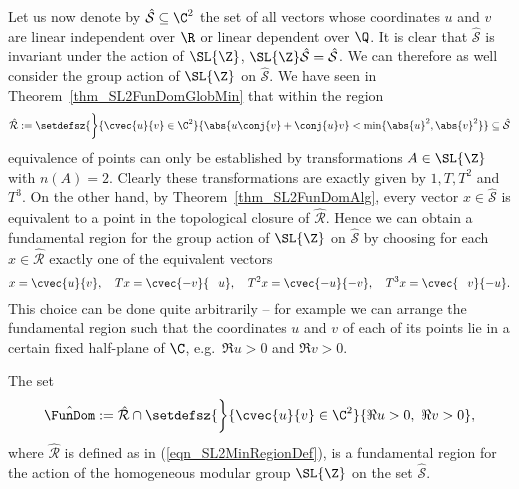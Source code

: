 Let us now denote by $\hat{\mathcal{S}} \subseteq \C^2$ the set of all vectors whose coordinates $u$ and $v$ are linear independent over $\R$ or linear dependent over $\Q$. It is clear that $\hat{\mathcal{S}}$ is invariant under the action of $\SL{\Z}$, \ie $\SL{\Z}\hat{\mathcal{S}} = \hat{\mathcal{S}}$. We can therefore as well consider the group action of $\SL{\Z}$ on $\hat{\mathcal{S}}$. We have seen in Theorem~\ref{thm_SL2FunDomGlobMin} that within the region
\begin{equation}
\label{eqn_SL2MinRegionDef}
\hat{\mathcal{R}} := \setdefsz{\bigg}{\cvec{u}{v} \in \C^2}{\abs{u\conj{v} + \conj{u}v} < \min \{\abs{u}^2, \abs{v}^2\}} \subseteq \hat{\mathcal{S}}
\end{equation}
equivalence of points can only be established by transformations $A \in \SL{\Z}$ with $n(A) = 2$. Clearly these transformations are exactly given by $1, T, T^2$ and $T^3$. On the other hand, by Theorem~\ref{thm_SL2FunDomAlg}, every vector $x \in \hat{\mathcal{S}}$ is equivalent to a point in the topological closure of $\hat{\mathcal{R}}$. Hence we can obtain a fundamental region for the group action of $\SL{\Z}$ on $\hat{\mathcal{S}}$ by choosing for each $x \in \hat{\mathcal{R}}$ exactly one of the equivalent vectors 
\begin{equation*}
x = \cvec{u}{v},\quad 
Tx = \cvec{-v}{\phantom{+}u},\quad
T^2x = \cvec{-u}{-v},\quad
T^3x = \cvec{\phantom{+}v}{-u}.
\end{equation*}
This choice can be done quite arbitrarily -- for example we can arrange the fundamental region such that the coordinates $u$ and $v$ of each of its points lie in a certain fixed half-plane of $\C$, e.g.\ $\Re{u} > 0$ and $\Re{v} > 0$.
\begin{corollary}
\label{cor_SL2FunDom}
The set
\begin{equation}
\hat{\FunDom} := \hat{\mathcal{R}} \cap \setdefsz{\bigg}{\cvec{u}{v} \in \C^2}{\Re{u} > 0,\ \Re{v} > 0},
\end{equation}
where $\hat{\mathcal{R}}$ is defined as in (\ref{eqn_SL2MinRegionDef}), is a fundamental region for the action of the homogeneous modular group $\SL{\Z}$ on the set $\hat{\mathcal{S}}$.
\end{corollary}
